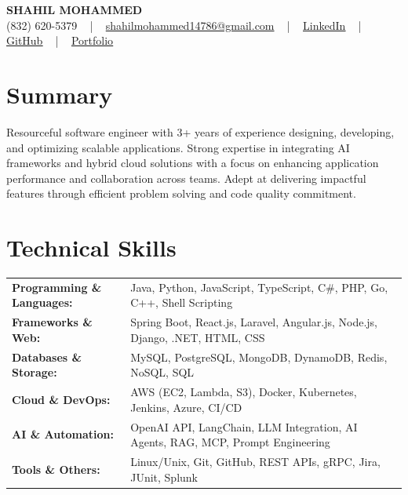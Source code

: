 \documentclass[letterpaper,11pt]{article}
\begin{document}
\begin{center}
    {\fontsize{14pt}{12pt}\selectfont \textbf{\MakeUppercase{Shahil Mohammed}}}\\ \vspace{2pt}
    \fontsize{10pt}{12pt}\selectfont (832) 620-5379 ~ | ~ \href{mailto:shahilmohammed14786@gmail.com}{shahilmohammed14786@gmail.com} ~ | ~  
    \href{https://www.linkedin.com/in/shahil-mohammed-9652931a1/}{\color{blue}\underline{LinkedIn}}  ~ | ~ 
    \href{https://github.com/freakbeast14}{\color{blue}\underline{GitHub}} ~ | ~ 
    \href{https://shahil-mohammed.netlify.app/}{\color{blue}\underline{Portfolio}}
    \vspace{-8pt}
\end{center}

\section{Summary}
\fontsize{9pt}{10pt}\selectfont
Resourceful software engineer with 3+ years of experience designing, developing, and optimizing scalable applications. Strong expertise in integrating AI frameworks and hybrid cloud solutions with a focus on enhancing application performance and collaboration across teams. Adept at delivering impactful features through efficient problem solving and code quality commitment.
 \vspace{-5pt}
 
\section{Technical Skills}
        \vspace{-14pt}
        \begin{table}[h]
            \fontsize{9pt}{10pt}\selectfont
            \begin{tabular}{p{0.3\linewidth} p{0.7\linewidth}}
                \textbf{Programming \& Languages:} & Java, Python, JavaScript, TypeScript, C\#, PHP, Go, C++, Shell Scripting \\
                \textbf{Frameworks \& Web:} & Spring Boot, React.js, Laravel, Angular.js, Node.js, Django, .NET, HTML, CSS \\
                \textbf{Databases \& Storage:} & MySQL, PostgreSQL, MongoDB, DynamoDB, Redis, NoSQL, SQL \\
                \textbf{Cloud \& DevOps:} & AWS (EC2, Lambda, S3), Docker, Kubernetes, Jenkins, Azure, CI/CD \\
                \textbf{AI \& Automation:} & OpenAI API, LangChain, LLM Integration, AI Agents, RAG, MCP, Prompt Engineering \\
                \textbf{Tools \& Others:} & Linux/Unix, Git, GitHub, REST APIs, gRPC, Jira, JUnit, Splunk \\
            \end{tabular}
        \end{table}
 \vspace{-15pt}
 
\end{document}
